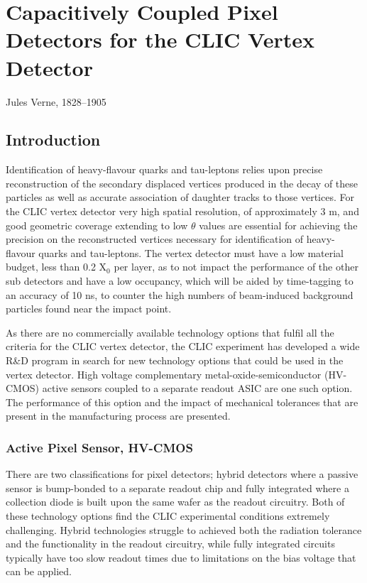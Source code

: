 \chapter{Capacitively Coupled Pixel Detectors for the CLIC Vertex Detector}
\label{chap:theory}

{Jules Verne, 1828--1905}


\section{Introduction}
Identification of heavy-flavour quarks and tau-leptons relies upon precise reconstruction of the secondary displaced vertices produced in the decay of these particles as well as accurate association of daughter tracks to those vertices.  For the CLIC vertex detector very high spatial resolution, of approximately 3 {\mu}m, and good geometric coverage extending to low $\theta$ values are essential for achieving the precision on the reconstructed vertices necessary for identification of heavy-flavour quarks and tau-leptons.  The vertex detector must have a low material budget, less than 0.2 $\text{X}_{0}$ per layer, as to not impact the performance of the other sub detectors and have a low occupancy, which will be aided by time-tagging to an accuracy of 10 ns, to counter the high numbers of beam-induced background particles found near the impact point.  

As there are no commercially available technology options that fulfil all the criteria for the CLIC vertex detector, the CLIC experiment has developed a wide R\&D program in search for new technology options that could be used in the vertex detector.  High voltage complementary metal-oxide-semiconductor (HV-CMOS) active sensors coupled to a separate readout ASIC are one such option.  The performance of this option and the impact of mechanical tolerances that are present in the manufacturing process are presented.  


\subsection{Active Pixel Sensor, HV-CMOS}
There are two classifications for pixel detectors; hybrid detectors where a passive sensor is bump-bonded to a separate readout chip and fully integrated where a collection diode is built upon the same wafer as the readout circuitry.  Both of these technology options find the CLIC experimental conditions extremely challenging.  Hybrid technologies struggle to achieved both the radiation tolerance and the functionality in the readout circuitry, while fully integrated circuits typically have too slow readout times due to limitations on the bias voltage that can be applied.  

